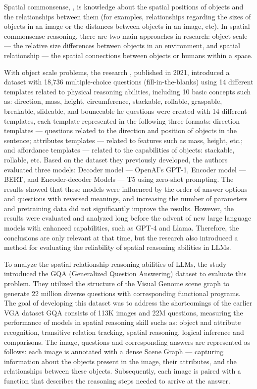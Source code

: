 Spatial commonsense, \cite{liu2022things}, is knowledge about the spatial positions of objects and the relationships between them 
(for examples, relationships regarding the sizes of objects in an image or the distances between objects in an image, etc).
In spatial commonsense reasoning, there are two main approaches in research: object scale — the relative size differences between objects 
in an environment, and spatial relationship — the spatial connections between objects or humans within a space. 

With object scale problems, the research \cite{aroca2021prost}, published in 2021, introduced a dataset with 18,736 multiple-choice questions (fill-in-the-blanks) 
using 14 different templates related to physical reasoning abilities, including 10 basic concepts such as: direction, mass, height, circumference, stackable, rollable, graspable, breakable, slideable, and bounceable
he questions were created with 14 different templates, each template represented in the following three formats: direction templates — questions related to the direction and position of objects in the sentence; 
attributes templates — related to features such as mass, height, etc.; and affordance templates — related to the capabilities of objects: stackable, rollable, etc. 
Based on the dataset they previously developed, the authors evaluated three models: Decoder model — OpenAI’s GPT-1, Encoder model — BERT, and Encoder-decoder Models — T5 using zero-shot prompting. 
The results showed that these models were influenced by the order of answer options and questions with reversed meanings, and increasing the number of parameters and pretraining data did not significantly improve the results.
However, the results were evaluated and analyzed long before the advent of new large language models with enhanced capabilities, such as GPT-4 and Llama. Therefore, the conclusions are only relevant at that time, 
but the research also introduced a method for evaluating the reliability of spatial reasoning abilities in LLMs.

To analyze the spatial relationship reasoning abilities of LLMs, the study \cite{hudson2019gqa} introduced the GQA (Generalized Question Answering) dataset to evaluate this problem. They utilized the structure of the Visual Genome scene graph
to generate 22 million diverse questions with corresponding functional programs. The goal of developing this dataset was to address the shortcomings of the earlier VGA dataset
GQA consists of 113K images and 22M questions, measuring the performance of models in spatial reasoning skill suchs as: object and
attribute recognition, transitive relation tracking, spatial reasoning, logical inference and comparisons. The image, questions and corresponding answers are represented as follows: each image is annotated with a dense Scene Graph — 
capturing information about the objects present in the image, their attributes, and the relationships between these objects.  Subsequently, each image is paired with a function that describes the reasoning steps needed to arrive at the answer.



